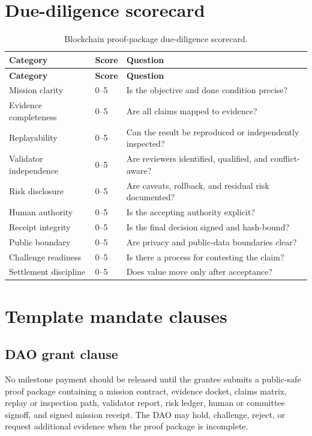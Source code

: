 \documentclass[11pt]{article}
\begin{document}
\section{Due-diligence scorecard}

\begin{longtable}{p{} p{} p{}}
\caption{Blockchain proof-package due-diligence scorecard.}\\
\toprule
\textbf{Category} & \textbf{Score} & \textbf{Question}\\
\midrule
\endfirsthead
\toprule
\textbf{Category} & \textbf{Score} & \textbf{Question}\\
\midrule
\endhead
Mission clarity & 0--5 & Is the objective and done condition precise? \\
Evidence completeness & 0--5 & Are all claims mapped to evidence? \\
Replayability & 0--5 & Can the result be reproduced or independently inspected? \\
Validator independence & 0--5 & Are reviewers identified, qualified, and conflict-aware? \\
Risk disclosure & 0--5 & Are caveats, rollback, and residual risk documented? \\
Human authority & 0--5 & Is the accepting authority explicit? \\
Receipt integrity & 0--5 & Is the final decision signed and hash-bound? \\
Public boundary & 0--5 & Are privacy and public-data boundaries clear? \\
Challenge readiness & 0--5 & Is there a process for contesting the claim? \\
Settlement discipline & 0--5 & Does value move only after acceptance? \\
\bottomrule
\end{longtable}

\section{Template mandate clauses}

\subsection{DAO grant clause}

No milestone payment should be released until the grantee submits a public-safe proof package containing a mission contract, evidence docket, claims matrix, replay or inspection path, validator report, risk ledger, human or committee signoff, and signed mission receipt. The DAO may hold, challenge, reject, or request additional evidence when the proof package is incomplete.
\end{document}
